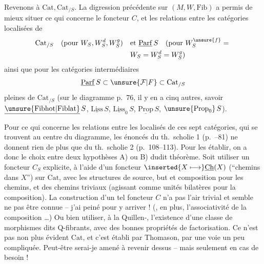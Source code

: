 Revenons à $\mathrm{Cat},\mathrm{Cat}_{/S}$. La digression précédente sur $(M,W,\mathrm{Fib})$ a permis de mieux situer ce qui concerne le foncteur $C$, et les relations entre les catégories localisées de
\[
\begin{aligned}
\mathrm{Cat}_{/S}\quad(\text{pour }W_S,W_S^d,W_S^g)\quad&\text{et }\underline{\mathrm{Parf}}\,S\quad(\text{pour }W_S^{\unsure{f}}={}\\
&W_S=W_S^d=W_S^g)
\end{aligned}
\]
ainsi que pour les catégories intermédiaires
\[
\underline{\mathrm{Parf}}\,S\subset\unsure{\mathcal F|F}\subset\mathrm{Cat}_{/S}
\]
pleines de $\mathrm{Cat}_{/S}$ (sur le diagramme p.~76, il y en a cinq autres, savoir $\underline{\unsure{\mathrm{Fibhot}|\mathrm{Fiblat}}}\,S$, $\underline{\mathrm{Liss}}\,S$, $\underline{\mathrm{Liss}}_0\,S$, $\underline{\mathrm{Prop}}\,S$, $\unsure{\mathrm{Prop}_0}\,S$).

Pour ce qui concerne les relations entre les localisés de ces sept catégories, qui se trouvent au centre du diagramme, les énoncés du th.~scholie 1 (p.~--81) ne donnent rien de plus que  du th.~scholie 2 (p.~108--113).  Pour les établir, on a donc le choix entre  deux hypothèses A) ou B) dudit théorème. Soit utiliser un foncteur $C_S$ explicite, à l'aide d'un
foncteur $\inserted{X\longmapsto}\underline{\mathrm{Ch}}(X)$ (``chemins dans $X$'') sur $\mathrm{Cat}$, avec les structures de source, but et composition pour les chemins, et des chemins triviaux (agissant comme unités bilatères pour la composition). La construction d'un tel foncteur $C$ n'a pas l'air trivial et semble ne pas être connue -- j'ai peiné pour y arriver ! (, en plus, l'associativité de la composition \ldots) Ou bien utiliser, à la Quillen-, l'existence d'une classe de morphismes dits Q-fibrants, avec des bonnes propriétés de factorisation.
Ce n'est pas non plus évident  $\mathrm{Cat}$, et c'est établi par Thomason, par une voie un peu compliquée. Peut-être serai-je amené à revenir dessus -- mais seulement en cas de besoin !

